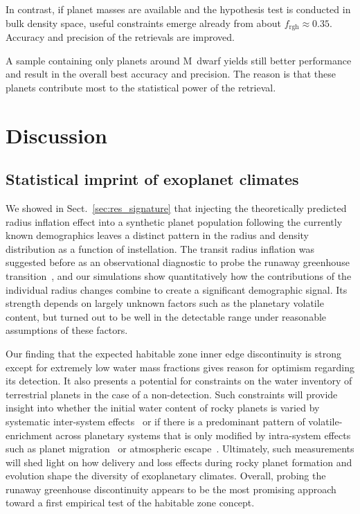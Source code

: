 \documentclass[twocolumn,twocolappendix,linenumbers]{aastex631}
\begin{document}
In contrast, if planet masses are available and the hypothesis test is conducted in bulk density space, useful constraints emerge already from about $f_\mathrm{rgh} \approx 0.35$.
Accuracy and precision of the retrievals are improved.

A sample containing only planets around M~dwarf yields still better performance and result in the overall best accuracy and precision.
The reason is that these planets contribute most to the statistical power of the retrieval.


\section{Discussion}\label{sec:discussion}

\subsection{Statistical imprint of exoplanet climates}
We showed in Sect.~\ref{sec:res_signature} that injecting the theoretically predicted radius inflation effect into a synthetic planet population following the currently known demographics leaves a distinct pattern in the radius and density distribution as a function of instellation.
The transit radius inflation was suggested before as an observational diagnostic to probe the runaway greenhouse transition~\citep{Turbet2019}, and our simulations show quantitatively how the contributions of the individual radius changes combine to create a significant demographic signal.
Its strength depends on largely unknown factors such as the planetary volatile content, but turned out to be well in the detectable range under reasonable assumptions of these factors.

Our finding that the expected habitable zone inner edge discontinuity is strong except for extremely low water mass fractions gives reason for optimism regarding its detection.
It also presents a potential for constraints on the water inventory of terrestrial planets in the case of a non-detection.
Such constraints will provide insight into whether the initial water content of rocky planets is varied by systematic inter-system effects~\citep[e.g.,][]{Raymond2004,Mulders2015b,Sato2016,Lichtenberg2019,2021ApJ...913L..20L,2022ApJ...938L...3L} or if there is a predominant pattern of volatile-enrichment across planetary systems that is only modified by intra-system effects such as planet migration~\citep{Schlecker2021} or atmospheric escape~\citep{Owen2016}.
Ultimately, such measurements will shed light on how delivery and loss effects during rocky planet formation and evolution shape the diversity of exoplanetary climates.
Overall, probing the runaway greenhouse discontinuity appears to be the most promising approach toward a first empirical test of the habitable zone concept.
\end{document}
